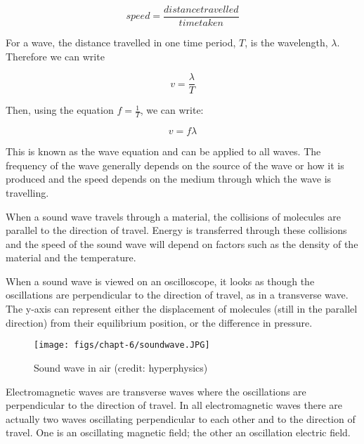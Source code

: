 \documentclass[revision-guide.tex]{subfiles}
\begin{document}

$$speed = \frac{distance travelled}{time taken}$$

For a wave, the distance travelled in one time period, $T$, is the wavelength, $\lambda$. Therefore we can write

\[v = \frac{\lambda}{T}\]

Then, using the equation $f=\frac{1}{T}$, we can write:

$$v = f\lambda$$

This is known as the wave equation and can be applied to all waves. The frequency of the wave generally depends on the source of the wave or how it is produced and the speed depends on the medium through which the wave is travelling.


When a sound wave travels through a material, the collisions of molecules are parallel to the direction of travel. Energy is transferred through these collisions and the speed of the sound wave will depend on factors such as the density of the material and the temperature.

When a sound wave is viewed on an oscilloscope, it looks as though the oscillations are perpendicular to the direction of travel, as in a transverse wave. The y-axis can represent either the displacement of molecules (still in the parallel direction) from their equilibrium position, or the difference in pressure.

\begin{figure}[h]
\texttt{[image: figs/chapt-6/soundwave.JPG]}
\caption{Sound wave in air (credit: hyperphysics)}
\label{Sound wave in air}
\end{figure}


Electromagnetic waves are transverse waves where the oscillations are perpendicular to the direction of travel. In all electromagnetic waves there are actually two waves oscillating perpendicular to each other and to the direction of travel. One is an oscillating magnetic field; the other an oscillation electric field.
\end{document}
